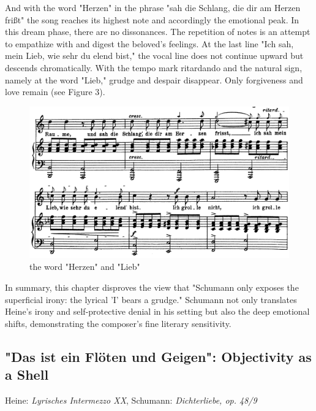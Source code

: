 \documentclass[10pt,a4paper,twocolumn]{rho}
\begin{document}
 And with the word "Herzen" in the phrase "sah die Schlang, die dir am Herzen frißt" the song reaches its highest note and accordingly the emotional peak. In this dream phase, there are no dissonances. The repetition of notes is an attempt to empathize with and digest the beloved's feelings. At the last line "Ich sah, mein Lieb, wie sehr du elend bist," the vocal line does not continue upward but descends chromatically. With the tempo mark ritardando and the natural sign, namely at the word "Lieb," grudge and despair disappear. Only forgiveness and love remain (see Figure 3).
\begin{figure}[H]
    \centering
    \includegraphics[width=0.7\linewidth]{Herzen and Liebe.png}
    \caption{the word "Herzen" and "Lieb"}
    \label{fig:enter-label}
\end{figure}
In summary, this chapter disproves the view that "Schumann only exposes the superficial irony: the lyrical 'I' bears a grudge." Schumann not only translates Heine's irony and self-protective denial in his setting but also the deep emotional shifts, demonstrating the composer's fine literary sensitivity.

\subsection{"Das ist ein Flöten und Geigen": Objectivity as a Shell}
Heine: \textit{Lyrisches Intermezzo XX}, Schumann: \textit{Dichterliebe, op. 48/9}
\end{document}

